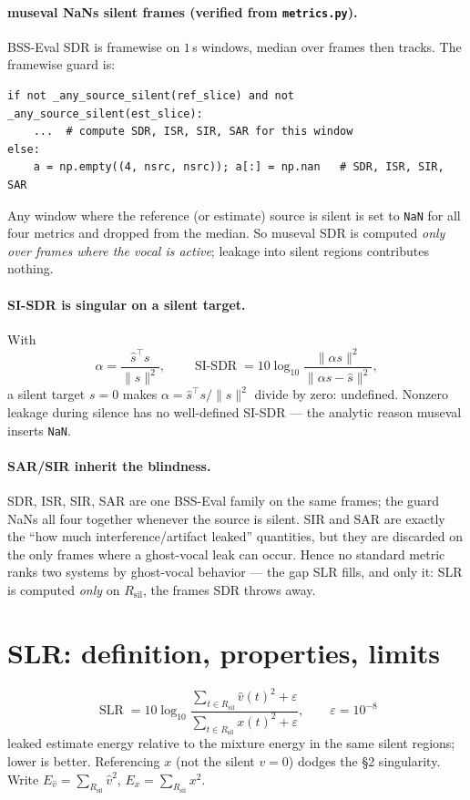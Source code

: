 \documentclass[11pt]{article}
\newcommand{\code}[1]{\texttt{#1}}
\DeclareMathOperator{\SISDR}{SI\text{-}SDR}
\DeclareMathOperator{\SLR}{SLR}
\newcommand{\eps}{\varepsilon}
\newcommand{\vhat}{\hat v}
\newcommand{\norm}[1]{\lVert #1 \rVert}
\newcommand{\Rsil}{R_{\text{sil}}}
\begin{document}
\paragraph{museval NaNs silent frames (verified from \code{metrics.py}).} BSS-Eval SDR is
framewise on $1$\,s windows, median over frames then tracks. The framewise guard is:
\begin{verbatim}
if not _any_source_silent(ref_slice) and not _any_source_silent(est_slice):
    ...  # compute SDR, ISR, SIR, SAR for this window
else:
    a = np.empty((4, nsrc, nsrc)); a[:] = np.nan   # SDR, ISR, SIR, SAR
\end{verbatim}
Any window where the reference (or estimate) source is silent is set to \code{NaN} for all
four metrics and dropped from the median. So museval SDR is computed \emph{only over frames
where the vocal is active}; leakage into silent regions contributes nothing.

\paragraph{SI-SDR is singular on a silent target.} With
\[
\alpha = \frac{\hat s^{\top} s}{\norm{s}^2}, \qquad
\SISDR = 10\log_{10}\frac{\norm{\alpha s}^2}{\norm{\alpha s - \hat s}^2},
\]
a silent target $s=0$ makes $\alpha = \hat s^\top s/\norm{s}^2$ divide by zero: undefined.
Nonzero leakage during silence has no well-defined SI-SDR --- the analytic reason museval
inserts \code{NaN}.

\paragraph{SAR/SIR inherit the blindness.} SDR, ISR, SIR, SAR are one BSS-Eval family on
the same frames; the guard NaNs all four together whenever the source is silent. SIR and
SAR are exactly the ``how much interference/artifact leaked'' quantities, but they are
discarded on the only frames where a ghost-vocal leak can occur. Hence no standard metric
ranks two systems by ghost-vocal behavior --- the gap SLR fills, and only it: SLR is
computed \emph{only} on $\Rsil$, the frames SDR throws away.

\section{SLR: definition, properties, limits}
\begin{equation}
\boxed{\ \SLR = 10\log_{10}
  \frac{\sum_{t\in \Rsil}\vhat(t)^2 + \eps}{\sum_{t\in \Rsil} x(t)^2 + \eps},
  \qquad \eps = 10^{-8}\ }
\end{equation}
leaked estimate energy relative to the mixture energy in the same silent regions; lower is
better. Referencing $x$ (not the silent $v=0$) dodges the \S2 singularity. Write
$E_{\vhat}=\sum_{\Rsil}\vhat^2$, $E_x=\sum_{\Rsil}x^2$.
\end{document}
